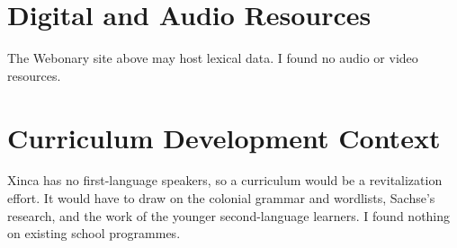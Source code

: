 \documentclass[12pt]{article}
\begin{document}
\section{Digital and Audio Resources}
The Webonary site above may host lexical data. I found no audio or video resources.

\section{Curriculum Development Context}
Xinca has no first-language speakers, so a curriculum would be a revitalization effort. It would have to draw on the colonial grammar and wordlists, Sachse's research, and the work of the younger second-language learners. I found nothing on existing school programmes.
\end{document}
